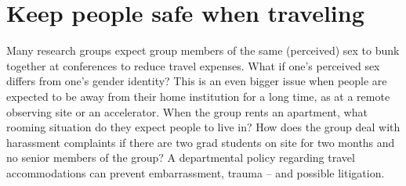 \section {Keep people safe when traveling}
\label{accommodations}
Many research groups expect group members of the same (perceived) sex to bunk together at conferences to reduce travel expenses.  What if one's perceived sex differs from one's gender identity?  This is an even bigger issue when people are expected to be away from their home institution for a long time, as at a remote observing site or an accelerator. When the group rents an apartment, what rooming situation do they expect people to live in? How does the group deal with harassment complaints if there are two grad students on site for two months and no senior members of the group?  A departmental policy regarding travel accommodations can prevent embarrassment, trauma -- and possible litigation.















